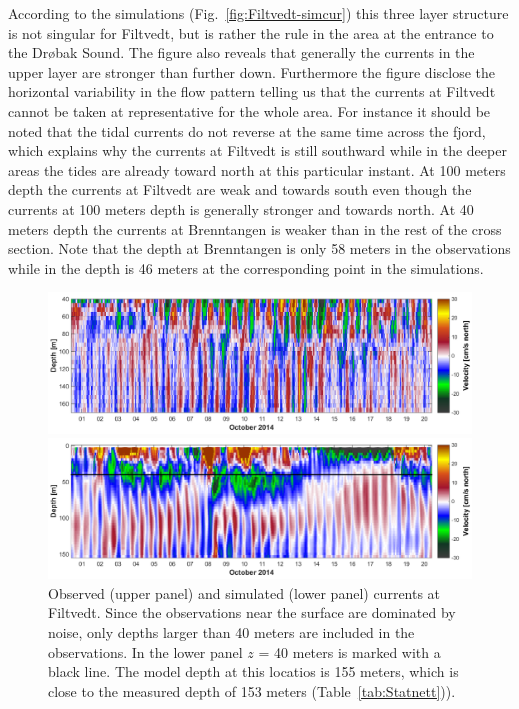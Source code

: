 According to the simulations (Fig.~\ref{fig:Filtvedt-simcur}) this three layer structure is not singular for Filtvedt, but is rather the rule in the area at the entrance to the Dr{\o}bak Sound. The figure also reveals that generally the currents in the upper layer are stronger than further down. Furthermore the figure disclose the horizontal variability in the flow pattern telling us that the currents at Filtvedt cannot be taken at representative for the whole area. For instance it should be noted that the tidal currents do not reverse at the same time across the fjord, which explains why the currents at Filtvedt is still southward while in the deeper areas the tides are already toward north at this particular instant. At 100 meters depth the currents at Filtvedt are weak and towards south even though the currents at 100 meters depth is generally stronger and towards north. At 40 meters depth the currents at Brenntangen is weaker than in the rest of the cross section. Note that the depth at Brenntangen is only 58 meters in the observations while in the depth is 46 meters at the corresponding point in the simulations. 

\begin{figure}[ht]
\centerline{
\includegraphics*[trim=0 0 0 0,clip=true,width=\textwidth]{Figurer/Filtvedt_obs_cur}}
\centerline{
\includegraphics*[trim=0 0 0 0,clip=true,width=\textwidth]{Figurer/Filtvedt_sim_cur}}
\caption{\small
Observed (upper panel) and simulated (lower panel) currents at Filtvedt. Since the observations near the surface are dominated by noise, only depths larger than 40 meters are included in the observations. In the lower panel $z$ = 40 meters is marked with a black line. The model depth at this locatios is 155 meters, which is close to the measured depth of 153 meters (Table~\ref{tab:Statnett})).}
\label{fig:Filtvedt-cur}
\end{figure}

